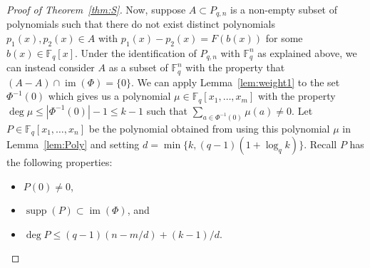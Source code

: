 \documentclass[11pt, reqno]{amsart}
\theoremstyle{definition}
\newcommand{\F}{\mathbb{F}}
\DeclareMathOperator{\supp}{supp}
\DeclareMathOperator{\im}{im}
\begin{document}
\begin{proof}[Proof of Theorem~\ref{thm:S}]
Now, suppose $A \subset P_{q,n}$ is a non-empty subset of polynomials such that there do not exist distinct polynomials $p_1(x),p_2(x) \in A$  with $p_1(x) - p_2(x) = F(b(x))$ for some $b(x) \in \F_q[x]$. Under the identification of $P_{q,n}$ with $\F_q^n$ as explained above, we can instead consider $A$ as a subset of $\F_q^n$ with the property that $(A-A) \cap \im(\Phi) = \{ 0 \}$. We can apply Lemma~\ref{lem:weight1} to the set $\Phi^{-1}(0)$ which gives us a polynomial $\mu\in \F_q[x_1,\dots,x_m]$ with the property $\deg \mu \leq |\Phi^{-1}(0)| - 1 \leq k-1$ such that $\sum_{a \in \Phi^{-1}(0)} \mu(a) \neq 0$. Let $P \in \F_q[x_1, \ldots, x_n]$ be the polynomial obtained from using this polynomial $\mu$ in Lemma~\ref{lem:Poly} and setting $d = \min\{ k, (q-1)(1+ \log_q k) \}$. Recall $P$ has the following properties:
\begin{itemize}
    \item $P(0) \neq 0$,
    \item $\supp(P) \subset \im(\Phi)$, and
    \item $\deg P \leq (q-1)(n- m/d) + (k-1)/d$.
\end{itemize}


\end{proof}
\end{document}
